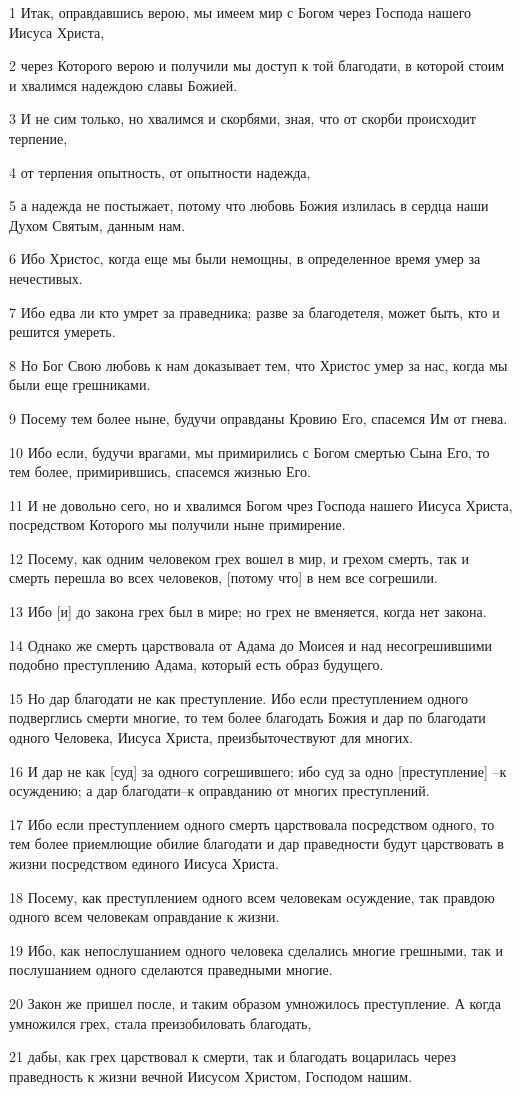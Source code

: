 \par 1 Итак, оправдавшись верою, мы имеем мир с Богом через Господа нашего Иисуса Христа,
\par 2 через Которого верою и получили мы доступ к той благодати, в которой стоим и хвалимся надеждою славы Божией.
\par 3 И не сим только, но хвалимся и скорбями, зная, что от скорби происходит терпение,
\par 4 от терпения опытность, от опытности надежда,
\par 5 а надежда не постыжает, потому что любовь Божия излилась в сердца наши Духом Святым, данным нам.
\par 6 Ибо Христос, когда еще мы были немощны, в определенное время умер за нечестивых.
\par 7 Ибо едва ли кто умрет за праведника; разве за благодетеля, может быть, кто и решится умереть.
\par 8 Но Бог Свою любовь к нам доказывает тем, что Христос умер за нас, когда мы были еще грешниками.
\par 9 Посему тем более ныне, будучи оправданы Кровию Его, спасемся Им от гнева.
\par 10 Ибо если, будучи врагами, мы примирились с Богом смертью Сына Его, то тем более, примирившись, спасемся жизнью Его.
\par 11 И не довольно сего, но и хвалимся Богом чрез Господа нашего Иисуса Христа, посредством Которого мы получили ныне примирение.
\par 12 Посему, как одним человеком грех вошел в мир, и грехом смерть, так и смерть перешла во всех человеков, [потому что] в нем все согрешили.
\par 13 Ибо [и] до закона грех был в мире; но грех не вменяется, когда нет закона.
\par 14 Однако же смерть царствовала от Адама до Моисея и над несогрешившими подобно преступлению Адама, который есть образ будущего.
\par 15 Но дар благодати не как преступление. Ибо если преступлением одного подверглись смерти многие, то тем более благодать Божия и дар по благодати одного Человека, Иисуса Христа, преизбыточествуют для многих.
\par 16 И дар не как [суд] за одного согрешившего; ибо суд за одно [преступление] --к осуждению; а дар благодати--к оправданию от многих преступлений.
\par 17 Ибо если преступлением одного смерть царствовала посредством одного, то тем более приемлющие обилие благодати и дар праведности будут царствовать в жизни посредством единого Иисуса Христа.
\par 18 Посему, как преступлением одного всем человекам осуждение, так правдою одного всем человекам оправдание к жизни.
\par 19 Ибо, как непослушанием одного человека сделались многие грешными, так и послушанием одного сделаются праведными многие.
\par 20 Закон же пришел после, и таким образом умножилось преступление. А когда умножился грех, стала преизобиловать благодать,
\par 21 дабы, как грех царствовал к смерти, так и благодать воцарилась через праведность к жизни вечной Иисусом Христом, Господом нашим.

